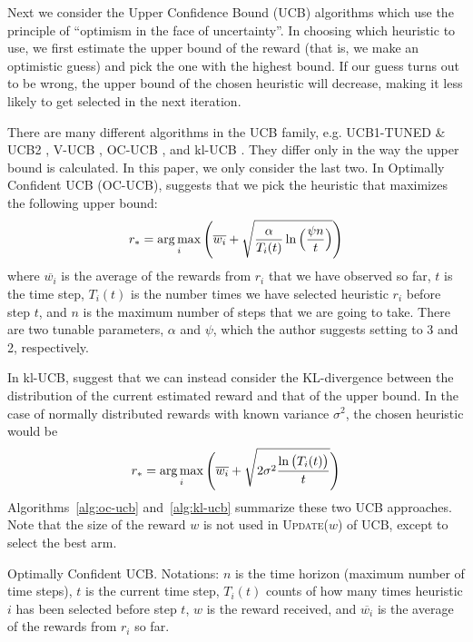\documentclass[fleqn,10pt,lineno]{wlpeerj} %
\newcommand*{\argmax}{\operatornamewithlimits{arg\,max}\limits}
\newcommand{\Select}{\textsc{Select}}
\newcommand{\Update}{\textsc{Update}}
\begin{document}
 Next we consider the Upper Confidence Bound (UCB) algorithms which use the
principle of ``optimism in the face of uncertainty''. In choosing which
heuristic to use, we first estimate the upper bound of the reward (that is, we
make an optimistic guess) and pick the one with the highest bound. If our guess
turns out to be wrong, the upper bound of the chosen heuristic will decrease,
making it less likely to get selected in the next iteration.

There are many different algorithms in the UCB family, e.g. UCB1-TUNED \& UCB2
\citep{auer02finite}, V-UCB \citep{audibert09}, OC-UCB \citep{lattimore15}, and
kl-UCB \citep{cappe13}. They differ only in the way the upper bound is
calculated. In this paper, we only consider the last two. In Optimally
Confident UCB (OC-UCB), \cite{lattimore15} suggests that we pick the heuristic
that maximizes the following upper bound:
    \begin{align}
		r_* = \argmax_{i} \Bigg( \overline{w_i} +
			  \sqrt{\dfrac{\alpha}{T_i(t)} \ln\Big(\dfrac{\psi n}{t}\Big)} \Bigg)
    \end{align}
where $\overline{w_i}$ is the average of the rewards from $r_i$ that we have
observed so far, $t$ is the time step, $T_i(t)$ is the number times we have
selected heuristic $r_i$ before step $t$, and $n$ is the maximum number of
steps that we are going to take. There are two tunable parameters, $\alpha$ and
$\psi$, which the author suggests setting to 3 and 2, respectively.

In kl-UCB, \cite{cappe13} suggest that we can instead consider the
KL-divergence between the distribution of the current estimated reward and that
of the upper bound. In the case of normally distributed rewards with known
variance $\sigma^2$, the chosen heuristic would be
    \begin{align}
		r_* = \argmax_{i} \Bigg( \overline{w_i} +
			  \sqrt{ 2 \sigma^2 \dfrac{\ln\big(T_i(t)\big)}{t} } \Bigg)
    \end{align}
Algorithms~\ref{alg:oc-ucb} and~\ref{alg:kl-ucb} summarize these two UCB
approaches. Note that the size of the reward $w$ is not used in
\Update($w$) of UCB, except
to select the best arm.

\begin{algorithm}[htbp]
	\BlankLine
	\Fn{\Select()}{
		$r_* \leftarrow \argmax_{i} \overline{w_i} +
			  \sqrt{\dfrac{3}{T_i(t)} \ln\Big(\dfrac{2 n}{t}\Big)}$ \;
	}
	\BlankLine
	\Fn{\Update($w$)}{
		$t \leftarrow t + 1$ \;
		$T_*(t) \leftarrow T_*(t - 1) + 1$ \;
	}
	\caption{Optimally Confident UCB. Notations:
			 $n$ is the time horizon (maximum number of time steps), $t$ is the
			 current time step, $T_i(t)$ counts of how many times heuristic $i$
			 has been selected before step $t$, $w$ is the reward received, and
			 $\overline{w_i}$ is the average of the rewards from $r_i$ so
			 far.}
	\label{alg:oc-ucb}
\end{algorithm}
\end{document}
